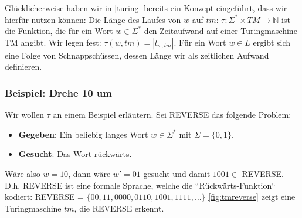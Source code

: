 Glücklicherweise haben wir in \autoref{turing} bereits ein Konzept eingeführt,
dass wir hierfür nutzen können:
Die Länge des Laufes von $w$ auf $tm$:
$\tau: \Sigma^* \times TM \rightarrow \mathbb{N}$ ist die Funktion,
die für ein Wort $w \in \Sigma^*$ den Zeitaufwand auf einer Turingmaschine TM angibt.
Wir legen fest: $\tau(w,tm) = |l_{w,tm}|$.
Für ein Wort $w \in L$ ergibt sich eine Folge von Schnappschüssen,
dessen Länge wir als zeitlichen Aufwand definieren.


\subsubsection{Beispiel: Drehe 10 um}

Wir wollen $\tau$ an einem Beispiel erläutern.
Sei REVERSE das folgende Problem:
\begin{itemize}
    \item \textbf{Gegeben}: Ein beliebig langes Wort $w \in \Sigma^*$ mit $\Sigma = \{0,1\}$.
    \item \textbf{Gesucht}: Das Wort rückwärts.
\end{itemize}

Wäre also $w = 10$, dann wäre $w' = 01$ gesucht und damit $1001 \in$ REVERSE.
D.h. REVERSE ist eine formale Sprache,
welche die ``Rückwärts-Funktion`` kodiert:
REVERSE = $\{00, 11, 0000, 0110, 1001, 1111, \ldots\}$
\autoref{fig:tmreverse} zeigt eine Turingmaschine $tm$, die REVERSE erkennt.

\newpage


